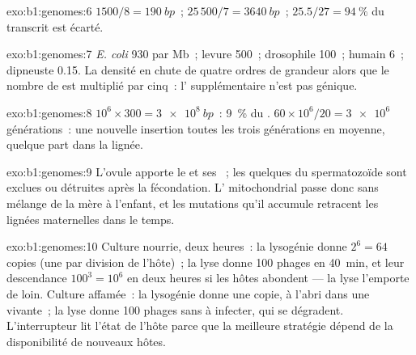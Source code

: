 \begin{solution}{exo:b1:genomes:6}
 $1500/8 = \qty{190}{bp}$~;  $25\,500/7 = \qty{3640}{bp}$~;
$25.5/27 = \qty{94}{\%}$ du transcrit est écarté.
\end{solution}

\begin{solution}{exo:b1:genomes:7}
\emph{E. coli} 930  par Mb~; levure 500~; drosophile 100~; humain
6~; dipneuste 0.15. La densité en  chute de quatre ordres de
grandeur alors que le nombre de  est multiplié par cinq~: l'
supplémentaire n'est pas génique.
\end{solution}

\begin{solution}{exo:b1:genomes:8}
$10^6\times 300 = \qty{3e8}{bp}$~: \qty{9}{\%} du . $60\times
10^6/20 = \num{3e6}$ générations~: une nouvelle insertion toutes les
trois générations en moyenne, quelque part dans la lignée.
\end{solution}

\begin{solution}{exo:b1:genomes:9}
L'ovule apporte le  et ses ~; les quelques
 du spermatozoïde sont exclues ou détruites après la
fécondation. L' mitochondrial passe donc sans mélange de la mère à
l'enfant, et les mutations qu'il accumule retracent les lignées
maternelles dans le temps.
\end{solution}

\begin{solution}{exo:b1:genomes:10}
Culture nourrie, deux heures~: la lysogénie donne $2^6 = 64$ copies (une
par division de l'hôte)~; la lyse donne 100 phages en \qty{40}{min}, et
leur descendance $100^3 = 10^6$ en deux heures si les hôtes abondent ---
la lyse l'emporte de loin. Culture affamée~: la lysogénie donne une
copie, à l'abri dans une  vivante~; la lyse donne 100 phages sans
 à infecter, qui se dégradent. L'interrupteur lit l'état de
l'hôte parce que la meilleure stratégie dépend de la disponibilité de
nouveaux hôtes.
\end{solution}

